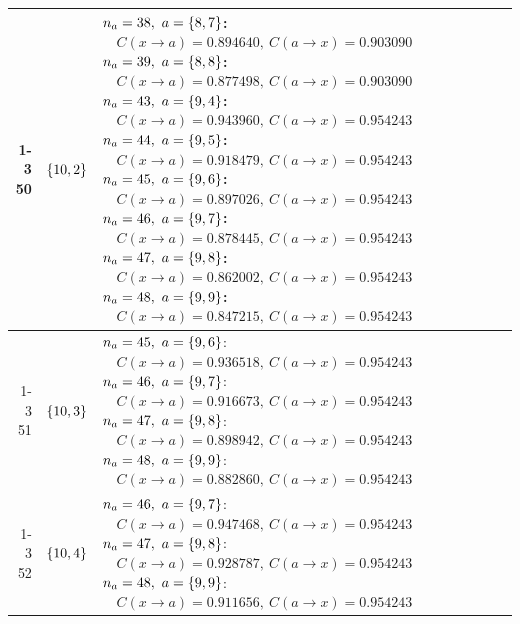 \begin{longtable}{@{}r l >{\raggedright\arraybackslash}p{}@{}}
  \cmidrule(lr){1-3}
  50 & \(\left\{10,2\right\}\) & \(n_a=38,\ a=\sig{8,7}\):\newline \(\quad C(x\!\to\!a)=0.894640,\ C(a\!\to\!x)=0.903090\)\newline \(n_a=39,\ a=\sig{8,8}\):\newline \(\quad C(x\!\to\!a)=0.877498,\ C(a\!\to\!x)=0.903090\)\newline \(n_a=43,\ a=\sig{9,4}\):\newline \(\quad C(x\!\to\!a)=0.943960,\ C(a\!\to\!x)=0.954243\)\newline \(n_a=44,\ a=\sig{9,5}\):\newline \(\quad C(x\!\to\!a)=0.918479,\ C(a\!\to\!x)=0.954243\)\newline \(n_a=45,\ a=\sig{9,6}\):\newline \(\quad C(x\!\to\!a)=0.897026,\ C(a\!\to\!x)=0.954243\)\newline \(n_a=46,\ a=\sig{9,7}\):\newline \(\quad C(x\!\to\!a)=0.878445,\ C(a\!\to\!x)=0.954243\)\newline \(n_a=47,\ a=\sig{9,8}\):\newline \(\quad C(x\!\to\!a)=0.862002,\ C(a\!\to\!x)=0.954243\)\newline \(n_a=48,\ a=\sig{9,9}\):\newline \(\quad C(x\!\to\!a)=0.847215,\ C(a\!\to\!x)=0.954243\) \\
  \cmidrule(lr){1-3}
  51 & \(\left\{10,3\right\}\) & \(n_a=45,\ a=\sig{9,6}\):\newline \(\quad C(x\!\to\!a)=0.936518,\ C(a\!\to\!x)=0.954243\)\newline \(n_a=46,\ a=\sig{9,7}\):\newline \(\quad C(x\!\to\!a)=0.916673,\ C(a\!\to\!x)=0.954243\)\newline \(n_a=47,\ a=\sig{9,8}\):\newline \(\quad C(x\!\to\!a)=0.898942,\ C(a\!\to\!x)=0.954243\)\newline \(n_a=48,\ a=\sig{9,9}\):\newline \(\quad C(x\!\to\!a)=0.882860,\ C(a\!\to\!x)=0.954243\) \\
  \cmidrule(lr){1-3}
  52 & \(\left\{10,4\right\}\) & \(n_a=46,\ a=\sig{9,7}\):\newline \(\quad C(x\!\to\!a)=0.947468,\ C(a\!\to\!x)=0.954243\)\newline \(n_a=47,\ a=\sig{9,8}\):\newline \(\quad C(x\!\to\!a)=0.928787,\ C(a\!\to\!x)=0.954243\)\newline \(n_a=48,\ a=\sig{9,9}\):\newline \(\quad C(x\!\to\!a)=0.911656,\ C(a\!\to\!x)=0.954243\) \\

\end{longtable}
